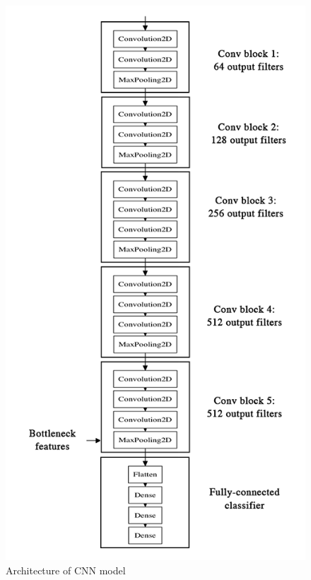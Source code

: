 \documentclass{article}[12pt,a4paper]
\begin{document}
\begin{figure}\hspace{6em}
\includegraphics[scale=0.6]{vgg16}
\caption{Architecture of CNN model}
\centering
\end{figure}
\newpage
\end{document}
